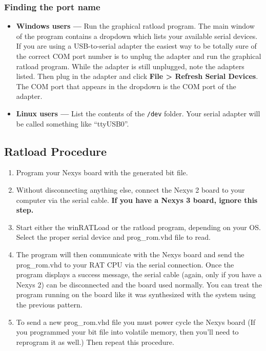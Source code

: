 \documentclass[notitlepage]{article}
\begin{document}
\subsubsection{Finding the port name}
\begin{itemize}
\item \textbf{Windows users --- } Run the graphical ratload program. The main window of the program contains a dropdown which lists your available serial devices. If you are using a USB-to-serial adapter the easiest way to be totally sure of the correct COM port number is to unplug the adapter and run the graphical ratload program. While the adapter is still unplugged, note the adapters listed. Then plug in the adapter and click \textbf{File > Refresh Serial Devices}. The COM port that appears in the dropdown is the COM port of the adapter.

\item \textbf{Linux users --- } List the contents of the \texttt{/dev} folder. Your serial adapter will be called something like ``ttyUSB0''.
\end{itemize}

\subsection{Ratload Procedure}
\begin{enumerate}
\item Program your Nexys board with the generated bit file.

\item Without disconnecting anything else, connect the Nexys 2 board to your computer via the serial cable. \textbf{If you have a Nexys 3 board, ignore this step.}

\item Start either the winRATLoad or the ratload program, depending on your OS. Select the proper serial device and prog\_rom.vhd file to read.

\item The program will then communicate with the Nexys board and send the prog\_rom.vhd to your RAT CPU via the serial connection. Once the program displays a success message, the serial cable (again, only if you have a Nexys 2) can be disconnected and the board used normally. You can treat the program running on the board like it was synthesized with the system using the previous pattern.

\item To send a new prog\_rom.vhd file you must power cycle the Nexys board (If you programmed your bit file into volatile memory, then you'll need to reprogram it as well.) Then repeat this procedure.
\end{enumerate}
\end{document}
